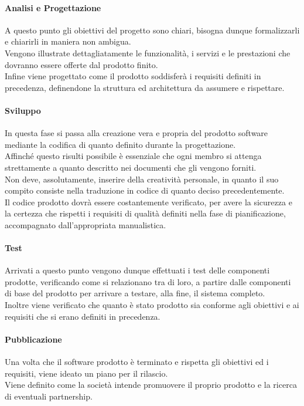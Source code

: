 \paragraph{Analisi e Progettazione}
A questo punto gli obiettivi del progetto sono chiari, bisogna dunque formalizzarli e chiarirli in maniera non ambigua.\\
Vengono illustrate dettagliatamente le funzionalità, i servizi e le prestazioni che dovranno essere offerte dal prodotto finito.\\
Infine viene progettato come il prodotto soddisferà i requisiti definiti in precedenza, definendone la struttura ed architettura da assumere e rispettare.

\paragraph{Sviluppo}
In questa fase si passa alla creazione vera e propria del prodotto software mediante la codifica di quanto definito durante la progettazione.\\
Affinché questo risulti possibile è essenziale che ogni membro si attenga strettamente a quanto descritto nei documenti che gli vengono forniti.\\
Non deve, assolutamente, inserire della creatività personale, in quanto il suo compito consiste nella traduzione in codice di quanto deciso precedentemente.\\
Il codice prodotto dovrà essere costantemente verificato, per avere la sicurezza e la certezza che rispetti i requisiti di qualità definiti nella fase di pianificazione, accompagnato dall'appropriata manualistica.

\paragraph{Test}
Arrivati a questo punto vengono dunque effettuati i test delle componenti prodotte, verificando come si relazionano tra di loro, a partire dalle componenti di base del prodotto per arrivare a testare, alla fine, il sistema completo.\\
Inoltre viene verificato che quanto è stato prodotto sia conforme agli obiettivi e ai requisiti che si erano definiti in precedenza.

\paragraph{Pubblicazione}
Una volta che il software prodotto è terminato e rispetta gli obiettivi ed i requisiti, viene ideato un piano per il rilascio.\\ Viene definito come la società intende promuovere il proprio prodotto e la ricerca di eventuali partnership.

